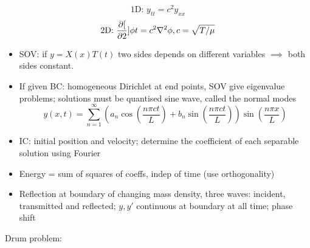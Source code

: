 \[\text{1D: } y_{tt} = c^2 y_{xx}\]
\[\text{2D: } \frac{\partial{[}}{\partial{2}}]{\phi}{t} = c^2 \mathbf{\nabla} ^2{\phi}, c=\sqrt{T/\mu}\]
\begin{itemize}

    \item SOV: if $y = X(x)T(t)$ two sides depends on different variables $\implies$ both sides constant.

    \item If given BC: homogeneous Dirichlet at end points, SOV give eigenvalue problems; solutions must be quantised sine wave, called the normal modes
          \[y(x,t) = \sum_{n=1}^{\infty} \left(a_n \cos \left(\frac{n \pi ct}{L}\right) + b_n \sin \left(\frac{n \pi ct}{L}\right)\right) \sin \left(\frac{n \pi x}{L} \right) \]

    \item IC: initial position and velocity; determine the coefficient of each separable solution using Fourier

    \item Energy = sum of squares of coeffs, indep of time (use orthogonality)

    \item Reflection at boundary of changing mass density, three waves: incident, transmitted and reflected; $y, y'$ continuous at boundary at all time; phase shift

\end{itemize}


Drum problem:

